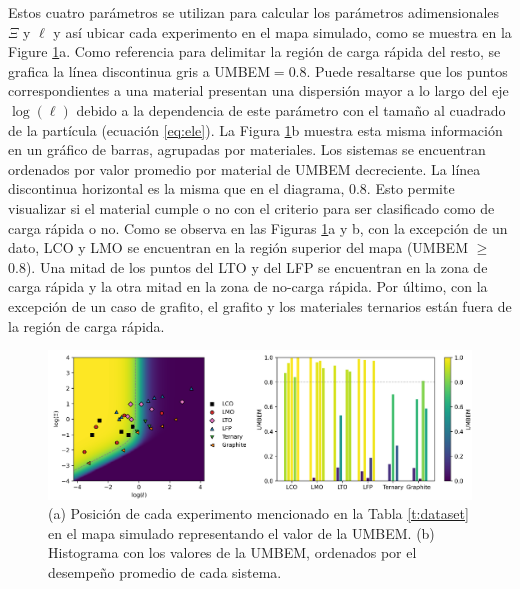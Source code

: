 Estos cuatro parámetros se utilizan para calcular los parámetros adimensionales 
$\Xi$ y $\ell$ y así ubicar cada experimento en el mapa simulado, como se muestra
en la Figure \ref{fig:UMBEM}a. Como referencia para delimitar la región de carga
rápida del resto, se grafica la línea discontinua gris a UMBEM$ = 0.8$. Puede
resaltarse que los puntos correspondientes a una material presentan una 
dispersión mayor a lo largo del eje $\log(\ell)$ debido a la dependencia de este
parámetro con el tamaño al cuadrado de la partícula (ecuación \ref{eq:ele}). La
Figura \ref{fig:UMBEM}b muestra esta misma información en un gráfico de barras,
agrupadas por materiales. Los sistemas se encuentran ordenados por valor promedio 
por material de UMBEM decreciente. La línea discontinua horizontal es la misma que
en el diagrama, 0.8. Esto permite visualizar si el material cumple o no con el
criterio para ser clasificado como de carga rápida o no. Como se observa en las
Figuras \ref{fig:UMBEM}a y b, con la excepción de un dato, LCO y LMO se encuentran
en la región superior del mapa (UMBEM $\geq$ 0.8). Una mitad de los puntos del 
LTO y del LFP se encuentran en la zona de carga rápida y la otra mitad en la zona
de no-carga rápida. Por último, con la excepción de un caso de grafito, el grafito
y los materiales ternarios están fuera de la región de carga rápida.

\begin{figure}[h!]
    \centering
    \includegraphics[width=\textwidth]{FastCharging/umbem/UMBEM.png}
    \caption{(a) Posición de cada experimento mencionado en la Tabla 
    \ref{t:dataset} en el mapa simulado representando el valor de la UMBEM. (b)
    Histograma con los valores de la UMBEM, ordenados por el desempeño promedio
    de cada sistema.}
    \label{fig:UMBEM}
\end{figure}

